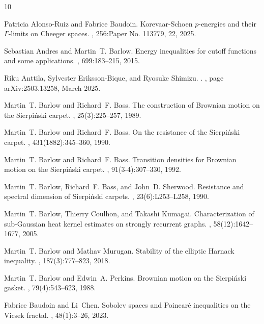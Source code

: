 \documentclass[11pt,a4paper]{article}
\numberwithin{equation}{section}
\theoremstyle{plain}
\theoremstyle{definition}
\begin{document}
\begin{thebibliography}{10}

Patricia Alonso-Ruiz and Fabrice Baudoin.
\newblock Korevaar-{S}choen {$p$}-energies and their {$\Gamma $}-limits on
  {C}heeger spaces.
, 256:Paper No. 113779, 22, 2025.

Sebastian Andres and Martin~T. Barlow.
\newblock Energy inequalities for cutoff functions and some applications.
, 699:183--215, 2015.

Riku {Anttila}, Sylvester {Eriksson-Bique}, and Ryosuke {Shimizu}.
.
, page arXiv:2503.13258, March 2025.

Martin~T. Barlow and Richard~F. Bass.
\newblock The construction of {B}rownian motion on the {S}ierpi\'{n}ski carpet.
, 25(3):225--257,
  1989.

Martin~T. Barlow and Richard~F. Bass.
\newblock On the resistance of the {S}ierpi\'{n}ski carpet.
, 431(1882):345--360, 1990.

Martin~T. Barlow and Richard~F. Bass.
\newblock Transition densities for {B}rownian motion on the {S}ierpi\'{n}ski
  carpet.
, 91(3-4):307--330, 1992.

Martin~T. Barlow, Richard~F. Bass, and John~D. Sherwood.
\newblock Resistance and spectral dimension of {S}ierpi\'{n}ski carpets.
, 23(6):L253--L258, 1990.

Martin~T. Barlow, Thierry Coulhon, and Takashi Kumagai.
\newblock Characterization of sub-{G}aussian heat kernel estimates on strongly
  recurrent graphs.
, 58(12):1642--1677, 2005.

Martin~T. Barlow and Mathav Murugan.
\newblock Stability of the elliptic {H}arnack inequality.
, 187(3):777--823, 2018.

Martin~T. Barlow and Edwin~A. Perkins.
\newblock Brownian motion on the {S}ierpi\'{n}ski gasket.
, 79(4):543--623, 1988.

Fabrice Baudoin and Li~Chen.
\newblock Sobolev spaces and {P}oincar\'e{} inequalities on the {V}icsek
  fractal.
, 48(1):3--26, 2023.


\end{thebibliography}
\end{document}
